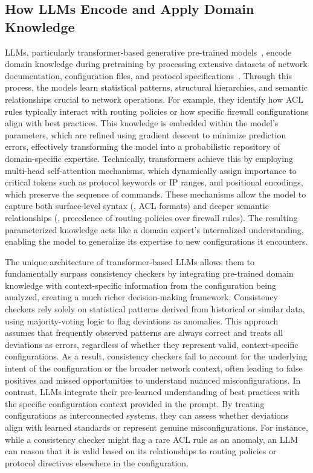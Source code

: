\subsection{How LLMs Encode and Apply Domain Knowledge}

 LLMs, particularly transformer-based generative pre-trained models~\cite{vaswani2017attention,hill2024transformers,lin2022survey}, encode domain knowledge during pretraining by processing extensive datasets of network documentation, configuration files, and protocol specifications~\cite{qiu2020pre,achiam2023gpt,touvron2023llama,brown2020language}. Through this process, the models learn statistical patterns, structural hierarchies, and semantic relationships crucial to network operations. For example, they identify how ACL rules typically interact with routing policies or how specific firewall configurations align with best practices. This knowledge is embedded within the model’s parameters, which are refined using gradient descent to minimize prediction errors, effectively transforming the model into a probabilistic repository of domain-specific expertise.
Technically, transformers achieve this by employing multi-head self-attention mechanisms, which dynamically assign importance to critical tokens such as protocol keywords or IP ranges, and positional encodings, which preserve the sequence of commands. These mechanisms allow the model to capture both surface-level syntax (\eg, ACL formats) and deeper semantic relationships (\eg, precedence of routing policies over firewall rules). The resulting parameterized knowledge acts like a domain expert’s internalized understanding, enabling the model to generalize its expertise to new configurations it encounters.

 The unique architecture of transformer-based LLMs allows them to fundamentally surpass consistency checkers by integrating pre-trained domain knowledge with context-specific information from the configuration being analyzed, creating a much richer decision-making framework. Consistency checkers rely solely on statistical patterns derived from historical or similar data, using majority-voting logic to flag deviations as anomalies. This approach assumes that frequently observed patterns are always correct and treats all deviations as errors, regardless of whether they represent valid, context-specific configurations. As a result, consistency checkers fail to account for the underlying intent of the configuration or the broader network context, often leading to false positives and missed opportunities to understand nuanced misconfigurations.
In contrast, LLMs integrate their pre-learned understanding of best practices with the specific configuration context provided in the prompt. By treating configurations as interconnected systems, they can assess whether deviations align with learned standards or represent genuine misconfigurations. For instance, while a consistency checker might flag a rare ACL rule as an anomaly, an LLM can reason that it is valid based on its relationships to routing policies or protocol directives elsewhere in the configuration.

